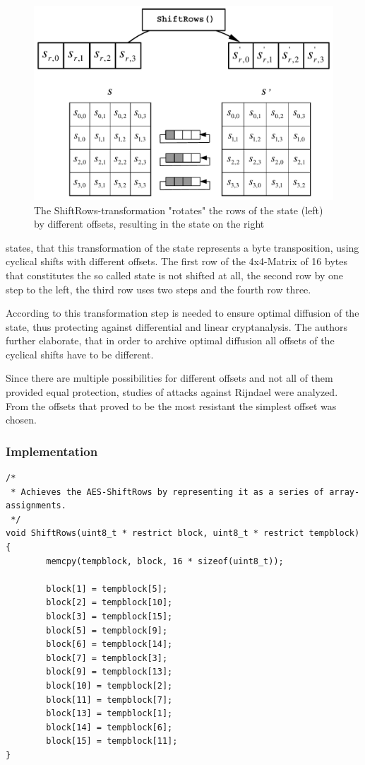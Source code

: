 \begin{figure}
\centering
\includegraphics[scale = 0.3]{data/figures/shiftrows.png} 
\caption{The ShiftRows-transformation "rotates" the rows of the state (left) by different offsets, resulting in the state on the right}
\end{figure}

\cite[p. 37]{rijndael} states, that this transformation of the state represents a byte transposition, using
cyclical shifts with different offsets. The first row of the 4x4-Matrix
of 16 bytes that constitutes the so called state is not shifted at all,
the second row by one step to the left, the third row uses two steps and
the fourth row three.

According to \cite{rijndael} this transformation step is needed to ensure
optimal diffusion of the state, thus protecting
against differential and linear cryptanalysis. The authors further
elaborate, that in order to archive optimal diffusion all
offsets of the cyclical shifts have to be different.

Since there are multiple possibilities for different offsets and not all
of them provided equal protection, studies of attacks against Rijndael
were analyzed. From the offsets that proved to be the most resistant the
simplest offset was chosen.

\hypertarget{implementation-3}{%
\subsubsection{Implementation}\label{implementation-3}}

\begin{lstlisting}
/*
 * Achieves the AES-ShiftRows by representing it as a series of array-assignments.
 */
void ShiftRows(uint8_t * restrict block, uint8_t * restrict tempblock)
{
        memcpy(tempblock, block, 16 * sizeof(uint8_t));

        block[1] = tempblock[5];
        block[2] = tempblock[10];
        block[3] = tempblock[15];
        block[5] = tempblock[9];
        block[6] = tempblock[14];
        block[7] = tempblock[3];
        block[9] = tempblock[13];
        block[10] = tempblock[2];
        block[11] = tempblock[7];
        block[13] = tempblock[1];
        block[14] = tempblock[6];
        block[15] = tempblock[11];
}
\end{lstlisting}

